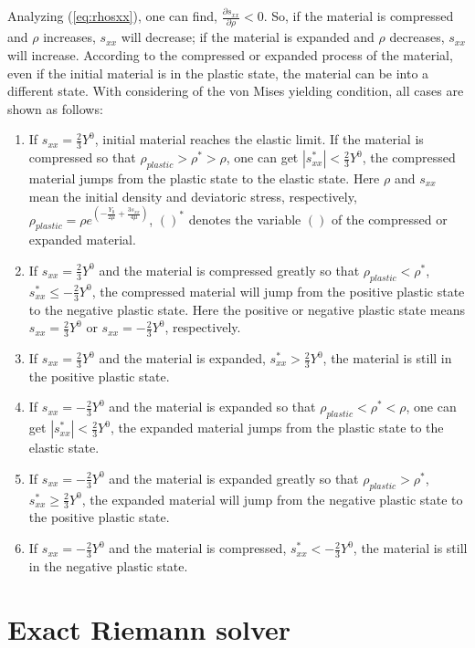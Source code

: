 \documentclass[review]{elsarticle}
\numberwithin{equation}{section}
\numberwithin{table}{section}
\begin{document}
Analyzing (\ref{eq:rhosxx}), one can find, $\frac{\partial s_{xx}}{\partial \rho}<0$. So, if the material is compressed and $\rho$ increases, $s_{xx}$ will decrease; if the material is expanded and $\rho$ decreases, $s_{xx}$ will increase. According to the compressed or expanded process of the material,  even if the initial material is in the plastic state, the material can be into a different state. With considering of the von Mises yielding condition, all cases are shown as follows:
\begin{enumerate}
  \item If $s_{xx}=\frac{2}{3}Y^{0}$, initial material reaches the elastic limit. If the material is compressed so that $\rho_{plastic}>\rho^{*}>\rho$, one can get $|s_{xx}^{*}|<\frac{2}{3}Y^{0}$, the compressed material jumps from the plastic state to the elastic state. Here $\rho$ and $s_{xx}$ mean the initial density and deviatoric stress, respectively, $\rho_{plastic} = \rho e^{\left(-\frac{Y_0}{2\mu}+\frac{3 s_{xx}}{4\mu}\right)}$, $( )^{*}$ denotes the variable $( )$ of the compressed or expanded material.
  \item If $s_{xx}=\frac{2}{3}Y^{0}$ and the material is compressed greatly so that  $\rho_{plastic}<\rho^{*}$, $s_{xx}^{*}\leq - \frac{2}{3}Y^{0}$, the compressed material will jump from the positive plastic state to the negative plastic state. Here the positive or negative plastic state means $s_{xx}=\frac{2}{3}Y^{0}$ or $s_{xx}=-\frac{2}{3}Y^{0}$, respectively.
  \item If $s_{xx}=\frac{2}{3}Y^{0}$ and  the material is expanded, $s_{xx}^{*}>\frac{2}{3}Y^{0}$, the material is still in the positive plastic state.
  \item If $s_{xx}=-\frac{2}{3}Y^{0}$ and the material is expanded so that $\rho_{plastic}<\rho^{*}<\rho$, one can get $|s_{xx}^{*}|<\frac{2}{3}Y^{0}$, the expanded material jumps from the plastic state to the elastic state.
  \item If $s_{xx}=-\frac{2}{3}Y^{0}$ and the material is expanded greatly so that  $\rho_{plastic}>\rho^{*}$, $s_{xx}^{*}\geq  \frac{2}{3}Y^{0}$, the expanded material will jump from the negative plastic state to the  positive plastic state.
  \item If $s_{xx}=-\frac{2}{3}Y^{0}$ and  the material is compressed, $s_{xx}^{*}<-\frac{2}{3}Y^{0}$, the material is still in the negative plastic state.
\end{enumerate}

\section{Exact Riemann solver} %
\end{document}
